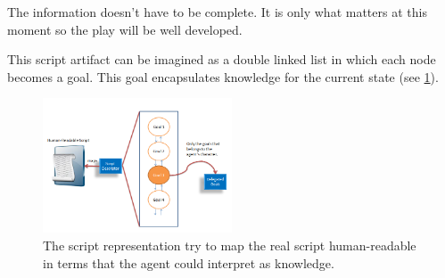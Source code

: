 The information doesn't have to be complete. It is only what matters at this moment so the play will be well developed.

This script artifact can be imagined as a double linked list in which each node becomes a goal. This goal encapsulates knowledge for the current state (see \ref{fig:ScriptRepresentation}).

\begin{figure}
	\centering
	\includegraphics[width=0.5\textwidth]{Images/ScriptRepresentation.png} 
	\caption{The script representation try to map the real script human-readable in terms that the agent could interpret as knowledge.}
	\label{fig:ScriptRepresentation}
\end{figure}



